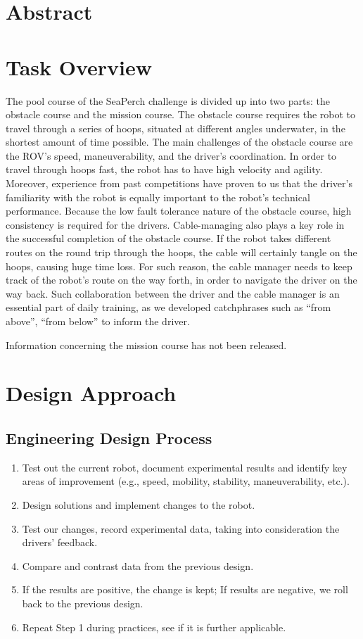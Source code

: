 \documentclass[11pt, oneside]{article}   	%
\begin{document}
\pagebreak

\section{Abstract}

\section{Task Overview}
	The pool course of the SeaPerch challenge is divided up into two parts: the obstacle course and the mission course. The obstacle course requires the robot to travel through a series of hoops, situated at different angles underwater, in the shortest amount of time possible. The main challenges of the obstacle course are the ROV’s speed, maneuverability, and the driver’s coordination. In order to travel through hoops fast, the robot has to have high velocity and agility. Moreover, experience from past competitions have proven to us that the driver’s familiarity with the robot is equally important to the robot’s technical performance. Because the low fault tolerance nature of the obstacle course, high consistency is required for the drivers. Cable-managing also plays a key role in the successful completion of the obstacle course. If the robot takes different routes on the round trip through the hoops, the cable will certainly tangle on the hoops, causing huge time loss. For such reason, the cable manager needs to keep track of the robot’s route on the way forth, in order to navigate the driver on the way back. Such collaboration between the driver and the cable manager is an essential part of daily training, as we developed catchphrases such as “from above”, “from below” to inform the driver.

Information concerning the mission course has not been released.

\section{Design Approach}
\subsection{Engineering Design Process}
\begin{enumerate}
	\item Test out the current robot, document experimental results and identify key areas of improvement (e.g., speed, mobility, stability, maneuverability, etc.).
	\item Design solutions and implement changes to the robot.
	\item Test our changes, record experimental data, taking into consideration the drivers’ feedback.
	\item Compare and contrast data from the previous design.
	\item If the results are positive, the change is kept; If results are negative, we roll back to the previous design.
	\item Repeat Step 1 during practices, see if it is further applicable.
\end{enumerate}
\end{document}
